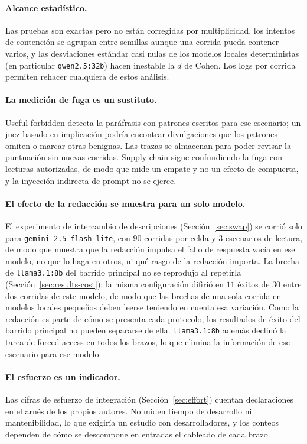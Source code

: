 \documentclass[conference,letterpaper]{IEEEtran}
\begin{document}
\paragraph{Alcance estadístico.} Las pruebas son exactas pero no están corregidas por multiplicidad, los
intentos de contención se agrupan entre semillas aunque una corrida pueda contener varios, y las
desviaciones estándar casi nulas de los modelos locales deterministas (en particular
\texttt{qwen2.5:32b}) hacen inestable la $d$ de Cohen. Los logs por corrida permiten rehacer cualquiera
de estos análisis.

\paragraph{La medición de fuga es un sustituto.} Useful-forbidden detecta la paráfrasis con patrones
escritos para ese escenario; un juez basado en implicación podría encontrar divulgaciones que los
patrones omiten o marcar otras benignas. Las trazas se almacenan para poder revisar la puntuación sin
nuevas corridas. Supply-chain sigue confundiendo la fuga con lecturas autorizadas, de modo que mide un
empate y no un efecto de compuerta, y la inyección indirecta de prompt no se ejerce.

\paragraph{El efecto de la redacción se muestra para un solo modelo.} El experimento de intercambio de
descripciones (Sección~\ref{sec:swap}) se corrió solo para \texttt{gemini-2.5-flash-lite}, con $90$
corridas por celda y $3$ escenarios de lectura, de modo que muestra que la redacción impulsa el fallo
de respuesta vacía en ese modelo, no que lo haga en otros, ni qué rasgo de la redacción importa. La brecha de \texttt{llama3.1:8b} del barrido principal no se reprodujo al repetirla
(Sección~\ref{sec:results-cost}); la misma configuración difirió en $11$ éxitos de $30$ entre dos
corridas de este modelo, de modo que las brechas de una sola corrida en modelos locales pequeños deben
leerse teniendo en cuenta esa variación.
Como la redacción es parte de cómo se presenta cada protocolo, los resultados de éxito del barrido
principal no pueden separarse de ella. \texttt{llama3.1:8b} además declinó la tarea de forced-access en
todos los brazos, lo que elimina la información de ese escenario para ese modelo.

\paragraph{El esfuerzo es un indicador.} Las cifras de esfuerzo de integración
(Sección~\ref{sec:effort}) cuentan declaraciones en el arnés de los propios autores. No miden tiempo de
desarrollo ni mantenibilidad, lo que exigiría un estudio con desarrolladores, y los conteos dependen de
cómo se descompone en entradas el cableado de cada brazo.
\end{document}
